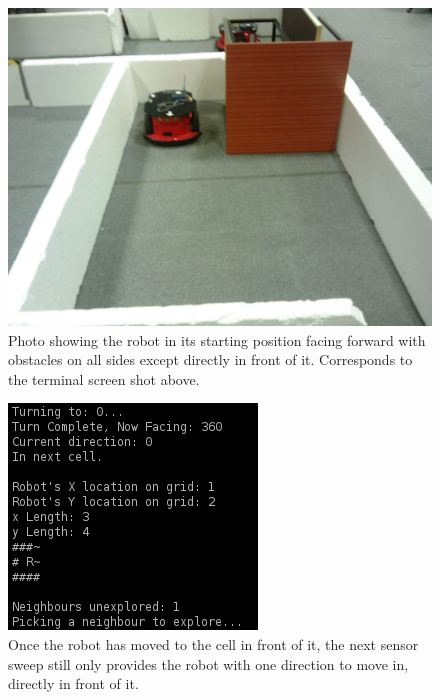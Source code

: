 \documentclass[a4paper,12pt]{article}
\begin{document}
\begin{figure}[H]
\includegraphics[scale=0.13]{RealS1.jpg}
\caption{Photo showing the robot in its starting position facing forward with obstacles on all sides except directly in front of it. Corresponds to the terminal screen shot above.}
\end{figure}

\begin{figure}[H]
\includegraphics[scale=1.0]{RealRunT2.png}
\caption{Once the robot has moved to the cell in front of it, the next sensor sweep still only provides the robot with one direction to move in, directly in front of it.}
\end{figure}
\end{document}
